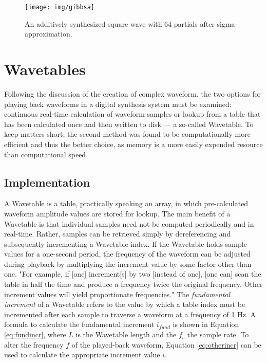 \begin{figure}
  \texttt{[image: img/gibbsa]}
  \caption{An additively synthesized square wave with 64 partials after sigma-approximation.}
  \label{fig:gibbsa}
\end{figure}

\pagebreak

\section{Wavetables}

Following the discussion of the creation of complex waveform, the two options for playing back waveforms in a digital synthesis system must be examined: continuous real-time calculation of waveform samples or lookup from a table that has been calculated once and then written to disk --- a so-called Wavetable. To keep matters short, the second method was found to be computationally more efficient and thus the better choice, as memory is a more easily expended resource than computational speed.

\subsection{Implementation}

A Wavetable is a table, practically speaking an array, in which pre-calculated waveform amplitude values are stored for lookup. The main benefit of a Wavetable is that individual samples need not be computed periodically and in real-time. Rather, samples can be retrieved simply by dereferencing and subsequently incrementing a Wavetable index. If the Wavetable holds sample values for a one-second period, the frequency of the waveform can be adjusted during playback by multiplying the increment value by some factor other than one. "For example, if [one] increment[s] by two [instead of one], [one can] scan the table in half the time and produce a frequency twice the original frequency. Other increment values will yield proportionate frequencies."  The \emph{fundamental increment} of a Wavetable refers to the value by which a table index must be incremented after each sample to traverse a waveform at a frequency of 1 Hz. A formula to calculate the fundamental increment $i_{fund}$ is shown in Equation \ref{eq:fundincr}, where $L$ is the Wavetable length and the $f_{s}$ the sample rate. To alter the frequency $f$ of the played-back waveform, Equation \ref{eq:otherincr} can be used to calculate the appropriate increment value $i$.


